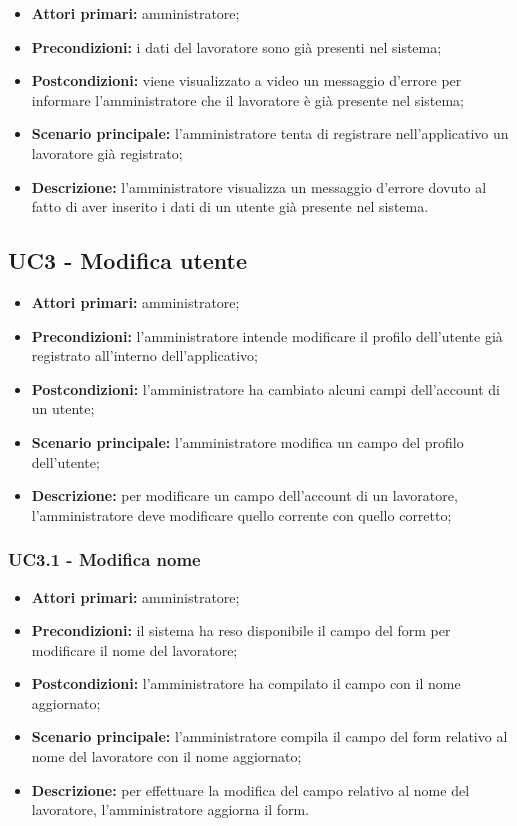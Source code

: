 \begin{itemize}
	\item 	\textbf{Attori primari:} amministratore;
	\item 	\textbf{Precondizioni:} i dati del lavoratore sono già presenti nel sistema;
	\item 	\textbf{Postcondizioni:} viene visualizzato a video un messaggio d’errore per informare l’amministratore che il lavoratore è già presente nel sistema;
	\item 	\textbf{Scenario principale:} l’amministratore tenta di registrare nell’applicativo un lavoratore già registrato;
	\item 	\textbf{Descrizione:} l’amministratore visualizza un messaggio d’errore dovuto al fatto di aver inserito i dati di un utente già presente nel sistema.
\end{itemize}

\subsection{UC3 - Modifica utente}

\begin{itemize}
	\item 	\textbf{Attori primari:} amministratore;
	\item 	\textbf{Precondizioni:} l’amministratore intende modificare il profilo dell’utente già registrato all’interno dell’applicativo;
	\item 	\textbf{Postcondizioni:} l’amministratore ha cambiato alcuni campi dell’account di un utente;
	\item 	\textbf{Scenario principale:} l’amministratore modifica un campo del profilo dell’utente;
	\item 	\textbf{Descrizione:} per modificare un campo dell’account di un lavoratore, l’amministratore deve modificare quello corrente con quello corretto;

\end{itemize}

\subsubsection{UC3.1 - Modifica nome}

\begin{itemize}
	\item 	\textbf{Attori primari:} amministratore;
	\item 	\textbf{Precondizioni:} il sistema ha reso disponibile il campo del form per modificare il nome del lavoratore;
	\item 	\textbf{Postcondizioni:}  l’amministratore ha compilato il campo con il nome aggiornato;
	\item 	\textbf{Scenario principale:} l’amministratore compila il campo del form relativo al nome del lavoratore con il nome aggiornato;
	\item 	\textbf{Descrizione:} per effettuare la modifica del campo relativo al nome del lavoratore, l’amministratore aggiorna il form.
\end{itemize}

